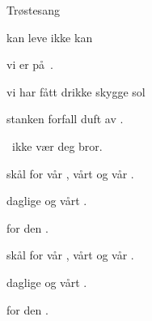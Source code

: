 \begin{SBSong}{Tr\o stesang}
\begin{SBVerse}
	 kan  leve  ikke kan   
	
	 vi er  p\aa\ .

	 vi har f\aa tt drikke  skygge  sol
	 
	 stanken  forfall  duft av .
	 
	\ ikke v\ae r  deg  bror.
  \end{SBVerse}
  \begin{SBChorus}
	 sk\aa l for v\aa r , v\aa rt  og v\aa r . 
	
	 daglige  og v\aa rt  . 
	
	 for den  .
  \end{SBChorus}
  \begin{SBChorus}
	 sk\aa l for v\aa r , v\aa rt  og v\aa r . 
	
	 daglige  og v\aa rt  . 
	
	 for den  .
  \end{SBChorus}
\end{SBSong}

